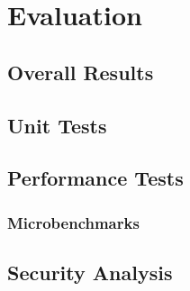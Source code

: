\documentclass[12pt,a4paper,twoside,openright]{report}
\begin{document}
\chapter{Evaluation}













\section{Overall Results}

\section{Unit Tests}

\section{Performance Tests}

\subsection{Microbenchmarks}

\section{Security Analysis}
\end{document}
